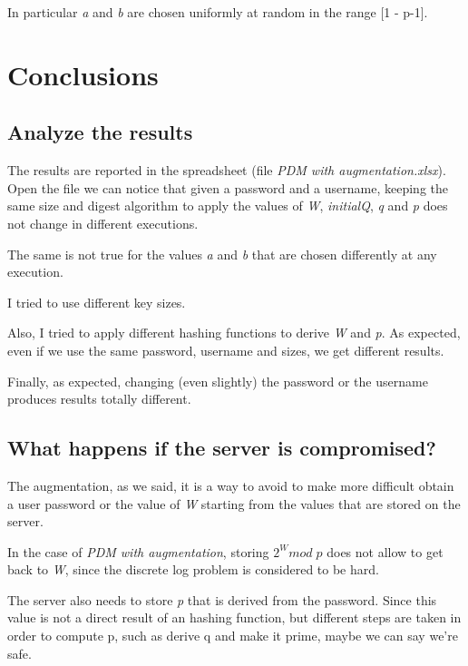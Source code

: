 \documentclass{article}
\begin{document}
In particular \emph{a} and \emph{b} are chosen uniformly at random in the range [1 - p-1].

\section{Conclusions}

\subsection{Analyze the results}

The results are reported in the spreadsheet (file \emph{PDM with augmentation.xlsx}).
Open the file we can notice that given a password and a username, keeping the same size and digest algorithm to apply
the values of \emph{W}, \emph{initialQ}, \emph{q} and \emph{p} does not change in different executions.

The same is not true for the values \emph{a} and \emph{b} that are chosen differently at any execution.

I tried to use different key sizes.

Also, I tried to apply different hashing functions to derive \emph{W} and \emph{p}. As expected,
even if we use the same password, username and sizes, we get different results.

Finally, as expected, changing (even slightly)  the password or the username produces
results totally different.

\subsection{What happens if the server is compromised?}

The augmentation, as we said, it is a way to avoid to make more difficult obtain a user password
or the value of \emph{W} starting from the values that are stored on the server.

In the case of \emph{PDM with augmentation}, storing $2^W mod  \; p$ does not allow to
get back to \emph{W}, since the discrete log problem is considered to be hard.

The server also needs to store \emph{p} that is derived from the password.
Since this value is not a direct result of an hashing function, but different steps are
taken in order to compute p, such as derive q and make it prime, maybe we can
say we're safe. 
\end{document}
